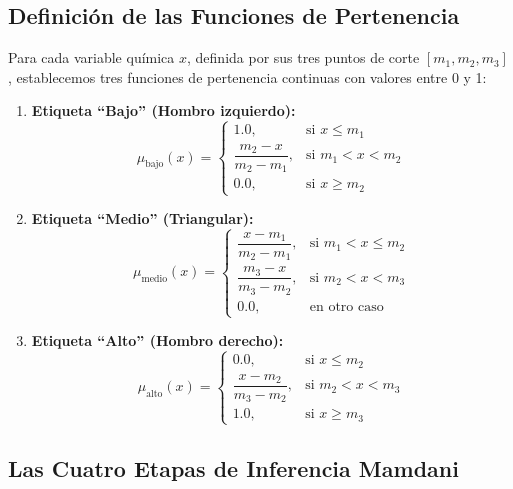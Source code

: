 \documentclass[11pt,a4paper]{article}
\begin{document}
\subsection{Definición de las Funciones de Pertenencia}
Para cada variable química $x$, definida por sus tres puntos de corte $[m_1, m_2, m_3]$, establecemos tres funciones de pertenencia continuas con valores entre 0 y 1:
\begin{enumerate}
    \item \textbf{Etiqueta ``Bajo'' (Hombro izquierdo):}
    \begin{equation}
    \mu_{\text{bajo}}(x) = \begin{cases}
    1.0, & \text{si } x \le m_1 \\
    \dfrac{m_2 - x}{m_2 - m_1}, & \text{si } m_1 < x < m_2 \\
    0.0, & \text{si } x \ge m_2
    \end{cases}
    \end{equation}

    \item \textbf{Etiqueta ``Medio'' (Triangular):}
    \begin{equation}
    \mu_{\text{medio}}(x) = \begin{cases}
    \dfrac{x - m_1}{m_2 - m_1}, & \text{si } m_1 < x \le m_2 \\
    \dfrac{m_3 - x}{m_3 - m_2}, & \text{si } m_2 < x < m_3 \\
    0.0, & \text{en otro caso}
    \end{cases}
    \end{equation}

    \item \textbf{Etiqueta ``Alto'' (Hombro derecho):}
    \begin{equation}
    \mu_{\text{alto}}(x) = \begin{cases}
    0.0, & \text{si } x \le m_2 \\
    \dfrac{x - m_2}{m_3 - m_2}, & \text{si } m_2 < x < m_3 \\
    1.0, & \text{si } x \ge m_3
    \end{cases}
    \end{equation}
\end{enumerate}

\subsection{Las Cuatro Etapas de Inferencia Mamdani}
\end{document}
